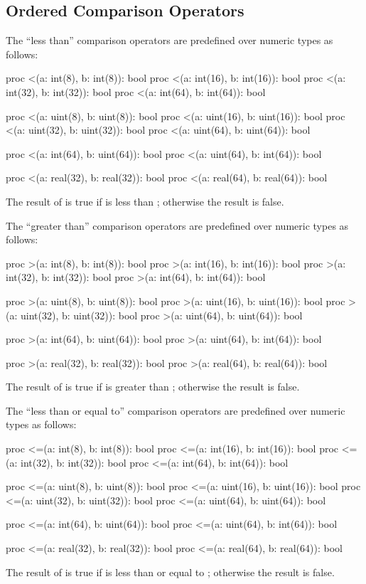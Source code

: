 \subsection{Ordered Comparison Operators}
\label{Ordered_Comparison_Operators}

The ``less than'' comparison operators are predefined over numeric
types as follows:
\begin{chapel}
proc <(a: int(8), b: int(8)): bool
proc <(a: int(16), b: int(16)): bool
proc <(a: int(32), b: int(32)): bool
proc <(a: int(64), b: int(64)): bool

proc <(a: uint(8), b: uint(8)): bool
proc <(a: uint(16), b: uint(16)): bool
proc <(a: uint(32), b: uint(32)): bool
proc <(a: uint(64), b: uint(64)): bool

proc <(a: int(64), b: uint(64)): bool
proc <(a: uint(64), b: int(64)): bool

proc <(a: real(32), b: real(32)): bool
proc <(a: real(64), b: real(64)): bool
\end{chapel}
The result of  is true if  is less than ;
otherwise the result is false.

The ``greater than'' comparison operators are predefined over numeric
types as follows:
\begin{chapel}
proc >(a: int(8), b: int(8)): bool
proc >(a: int(16), b: int(16)): bool
proc >(a: int(32), b: int(32)): bool
proc >(a: int(64), b: int(64)): bool

proc >(a: uint(8), b: uint(8)): bool
proc >(a: uint(16), b: uint(16)): bool
proc >(a: uint(32), b: uint(32)): bool
proc >(a: uint(64), b: uint(64)): bool

proc >(a: int(64), b: uint(64)): bool
proc >(a: uint(64), b: int(64)): bool

proc >(a: real(32), b: real(32)): bool
proc >(a: real(64), b: real(64)): bool
\end{chapel}
The result of  is true if  is greater
than ; otherwise the result is false.

The ``less than or equal to'' comparison operators are predefined over
numeric types as follows:
\begin{chapel}
proc <=(a: int(8), b: int(8)): bool
proc <=(a: int(16), b: int(16)): bool
proc <=(a: int(32), b: int(32)): bool
proc <=(a: int(64), b: int(64)): bool

proc <=(a: uint(8), b: uint(8)): bool
proc <=(a: uint(16), b: uint(16)): bool
proc <=(a: uint(32), b: uint(32)): bool
proc <=(a: uint(64), b: uint(64)): bool

proc <=(a: int(64), b: uint(64)): bool
proc <=(a: uint(64), b: int(64)): bool

proc <=(a: real(32), b: real(32)): bool
proc <=(a: real(64), b: real(64)): bool
\end{chapel}
The result of  is true if  is less than or equal
to ; otherwise the result is false.

